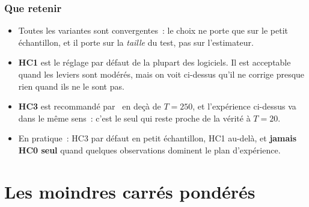 \documentclass[10pt]{beamer}
\begin{document}
\begin{frame}
  \frametitle{Que retenir}

  \begin{itemize}

  \item Toutes les variantes sont convergentes~: le choix ne porte que sur le
    petit échantillon, et il porte sur la \emph{taille} du test, pas sur
    l'estimateur.\newline

  \item \textbf{HC1} est le réglage par défaut de la plupart des logiciels. Il
    est acceptable quand les leviers sont modérés, mais on voit ci-dessus qu'il
    ne corrige presque rien quand ils ne le sont pas.\newline

  \item \textbf{HC3} est recommandé par~\cite{LongErvin2000} en deçà de $T=250$,
    et l'expérience ci-dessus va dans le même sens~: c'est le seul qui reste
    proche de la vérité à $T=20$.\newline

  \item[$\Rightarrow$] En pratique~: HC3 par défaut en petit échantillon, HC1
    au-delà, et \textbf{jamais HC0 seul} quand quelques observations dominent le
    plan d'expérience.\newline

  \end{itemize}


\end{frame}


\section{Les moindres carrés pondérés}
\end{document}
